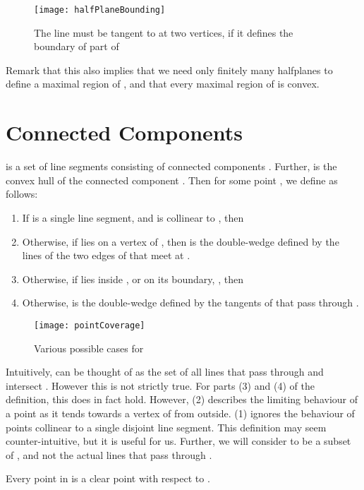 \documentclass{cccg12}
\begin{document}
\begin{figure}[ht]
  \centering
  \texttt{[image: halfPlaneBounding]}
  \caption{The line  must be tangent to  at two vertices, if it defines the boundary of part of }
  \label{fig:halfPlaneBounding}
\end{figure}

Remark that this also implies that we need only finitely many halfplanes to define a maximal region of , and that every maximal region of  is convex.



\section{Connected Components}

 is a set of  line segments consisting of  connected components . Further,  is the convex hull of the connected component . Then for some point , we define  as follows:

\begin{enumerate}
\item If  is a single line segment, and  is collinear to , then  
\item Otherwise, if  lies on a vertex of , then  is the double-wedge defined by the lines of the two edges of  that meet at . 
\item Otherwise, if  lies inside , or on its boundary, , then 
\item Otherwise,  is the double-wedge defined by the tangents of  that pass through . 
\end{enumerate}

\begin{figure}[ht]
  \centering
  \texttt{[image: pointCoverage]}
  \caption{Various possible cases for }
  \label{fig:pointCoverage}
\end{figure}

Intuitively,  can be thought of as the set of all lines that pass through  and intersect . However this is not strictly true. For parts (3) and (4) of the definition, this does in fact hold. However, (2) describes the limiting behaviour of a point as it tends towards a vertex of  from outside. (1) ignores the behaviour of points collinear to a single disjoint line segment. This definition may seem counter-intuitive, but it is useful for us. Further, we will consider  to be a subset of , and not the actual lines that pass through . 

\begin{lemma}
Every point in  is a clear point with respect to .
\end{lemma}
\end{document}
